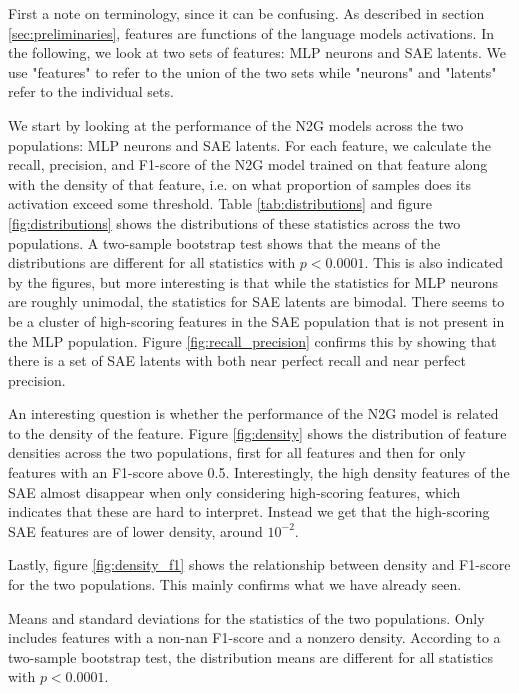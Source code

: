 First a note on terminology, since it can be confusing.
As described in section \ref{sec:preliminaries}, features are functions of the language models activations.
In the following, we look at two sets of features: MLP neurons and SAE latents.
We use "features" to refer to the union of the two sets while "neurons" and "latents" refer to the individual sets.

We start by looking at the performance of the N2G models across the two populations: MLP neurons and SAE latents.
For each feature, we calculate the recall, precision, and F1-score of the N2G model trained on that feature along with the density of that feature, i.e. on what proportion of samples does its activation exceed some threshold.
Table \ref{tab:distributions} and figure \ref{fig:distributions} shows the distributions of these statistics across the two populations.
A two-sample bootstrap test shows that the means of the distributions are different for all statistics with $p<0.0001$.
This is also indicated by the figures, but more interesting is that while the statistics for MLP neurons are roughly unimodal, the statistics for SAE latents are bimodal.
There seems to be a cluster of high-scoring features in the SAE population that is not present in the MLP population.
Figure \ref{fig:recall_precision} confirms this by showing that there is a set of SAE latents with both near perfect recall and near perfect precision.

An interesting question is whether the performance of the N2G model is related to the density of the feature.
Figure \ref{fig:density} shows the distribution of feature densities across the two populations, first for all features and then for only features with an F1-score above 0.5.
Interestingly, the high density features of the SAE almost disappear when only considering high-scoring features, which indicates that these are hard to interpret.
Instead we get that the high-scoring SAE features are of lower density, around $10^{-2}$.

Lastly, figure \ref{fig:density_f1} shows the relationship between density and F1-score for the two populations.
This mainly confirms what we have already seen.

\begin{table}[]
    \centering
    
    \caption{Means and standard deviations for the statistics of the two populations. Only includes features with a non-nan F1-score and a nonzero density. According to a two-sample bootstrap test, the distribution means are different for all statistics with $p<0.0001$.}
    \label{tab:distributions}
\end{table}

